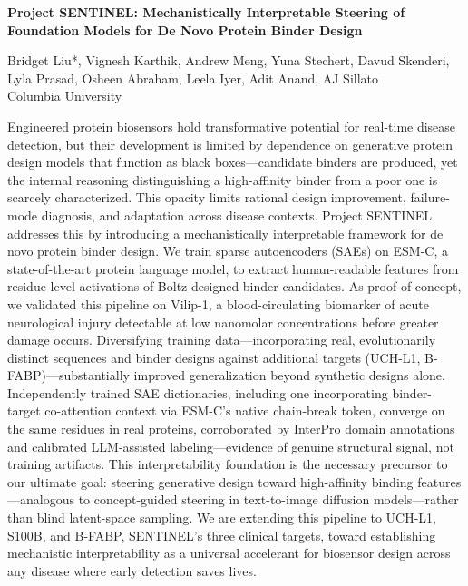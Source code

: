 \documentclass[11pt]{article}
\begin{document}
{\fontsize{15}{18}\selectfont\bfseries\centering
Project SENTINEL: Mechanistically Interpretable Steering of Foundation Models for De Novo Protein Binder Design\par}

\vspace{4pt}
{\centering
Bridget Liu*, Vignesh Karthik, Andrew Meng, Yuna Stechert, Davud Skenderi, Lyla Prasad, Osheen Abraham, Leela Iyer, Adit Anand, AJ Sillato\\
Columbia University\par}

\vspace{10pt}

Engineered protein biosensors hold transformative potential for real-time disease detection, but their development is limited by dependence on generative protein design models that function as black boxes---candidate binders are produced, yet the internal reasoning distinguishing a high-affinity binder from a poor one is scarcely characterized. This opacity limits rational design improvement, failure-mode diagnosis, and adaptation across disease contexts. Project SENTINEL addresses this by introducing a mechanistically interpretable framework for de novo protein binder design. We train sparse autoencoders (SAEs) on ESM-C, a state-of-the-art protein language model, to extract human-readable features from residue-level activations of Boltz-designed binder candidates. As proof-of-concept, we validated this pipeline on Vilip-1, a blood-circulating biomarker of acute neurological injury detectable at low nanomolar concentrations before greater damage occurs. Diversifying training data---incorporating real, evolutionarily distinct sequences and binder designs against additional targets (UCH-L1, B-FABP)---substantially improved generalization beyond synthetic designs alone. Independently trained SAE dictionaries, including one incorporating binder-target co-attention context via ESM-C's native chain-break token, converge on the same residues in real proteins, corroborated by InterPro domain annotations and calibrated LLM-assisted labeling---evidence of genuine structural signal, not training artifacts. This interpretability foundation is the necessary precursor to our ultimate goal: steering generative design toward high-affinity binding features---analogous to concept-guided steering in text-to-image diffusion models---rather than blind latent-space sampling. We are extending this pipeline to UCH-L1, S100B, and B-FABP, SENTINEL's three clinical targets, toward establishing mechanistic interpretability as a universal accelerant for biosensor design across any disease where early detection saves lives.

\end{document}
